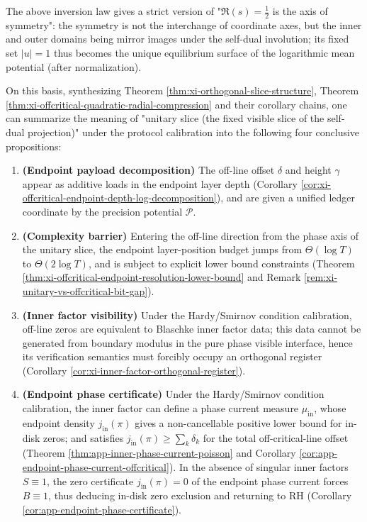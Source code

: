 The above inversion law gives a strict version of "\(\Re(s)=\tfrac12\) is the axis of symmetry": the symmetry is not the interchange of coordinate axes, but the inner and outer domains being mirror images under the self-dual involution; its fixed set \(|u|=1\) thus becomes the unique equilibrium surface of the logarithmic mean potential (after normalization).
\par
On this basis, synthesizing Theorem \ref{thm:xi-orthogonal-slice-structure}, Theorem \ref{thm:xi-offcritical-quadratic-radial-compression} and their corollary chains, one can summarize the meaning of "unitary slice (the fixed visible slice of the self-dual projection)" under the protocol calibration into the following four conclusive propositions:
\begin{enumerate}
  \item \textbf{(Endpoint payload decomposition)}
  The off-line offset \(\delta\) and height \(\gamma\) appear as additive loads in the endpoint layer depth (Corollary \ref{cor:xi-offcritical-endpoint-depth-log-decomposition}), and are given a unified ledger coordinate by the precision potential \(\mathcal{P}\).
  \item \textbf{(Complexity barrier)}
  Entering the off-line direction from the phase axis of the unitary slice, the endpoint layer-position budget jumps from \(\Theta(\log T)\) to \(\Theta(2\log T)\), and is subject to explicit lower bound constraints (Theorem \ref{thm:xi-offcritical-endpoint-resolution-lower-bound} and Remark \ref{rem:xi-unitary-vs-offcritical-bit-gap}).
  \item \textbf{(Inner factor visibility)}
  Under the Hardy/Smirnov condition calibration, off-line zeros are equivalent to Blaschke inner factor data; this data cannot be generated from boundary modulus in the pure phase visible interface, hence its verification semantics must forcibly occupy an orthogonal register (Corollary \ref{cor:xi-inner-factor-orthogonal-register}).
  \item \textbf{(Endpoint phase certificate)}
  Under the Hardy/Smirnov condition calibration, the inner factor can define a phase current measure \(\mu_{\mathrm{in}}\), whose endpoint density \(j_{\mathrm{in}}(\pi)\) gives a non-cancellable positive lower bound for in-disk zeros; and satisfies \(j_{\mathrm{in}}(\pi)\ge \sum_k\delta_k\) for the total off-critical-line offset (Theorem \ref{thm:app-inner-phase-current-poisson} and Corollary \ref{cor:app-endpoint-phase-current-offcritical}).
  In the absence of singular inner factors \(S\equiv 1\), the zero certificate \(j_{\mathrm{in}}(\pi)=0\) of the endpoint phase current forces \(B\equiv 1\), thus deducing in-disk zero exclusion and returning to RH (Corollary \ref{cor:app-endpoint-phase-certificate}).
\end{enumerate}
\par
